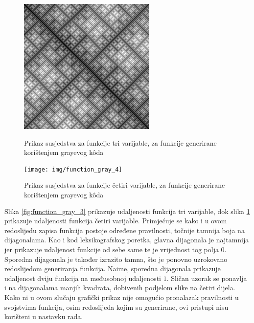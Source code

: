\begin{figure}[!ht]
    \centering
    \begin{minipage}{.5\textwidth}
        \centering
        \includegraphics[width=.95\textwidth]{img/function_gray_3}
        \captionsetup{justification=centering}
        \caption{Prikaz susjedstva za funkcije tri varijable, za funkcije generirane korištenjem grayevog k\^oda}
        \label{fig:function_gray_3}
    \end{minipage}%
    \begin{minipage}{.5\textwidth}
        \centering
        \texttt{[image: img/function\_gray\_4]}
        \captionsetup{justification=centering}
        \caption{Prikaz susjedstva za funkcije četiri varijable, za funkcije generirane korištenjem grayevog k\^oda}
        \label{fig:function_gray_4}
    \end{minipage}
\end{figure}


Slika \ref{fig:function_gray_3} prikazuje udaljenosti funkcija tri varijable, dok slika \ref{fig:function_gray_4} prikazuje udaljenosti funkcija četiri varijable.
Primjećuje se kako i u ovom redoslijedu zapisa funkcija postoje određene pravilnosti, točnije tamnija boja na dijagonalama.
Kao i kod leksikografskog poretka, glavna dijagonala je najtamnija jer prikazuje udaljenost funkcije od sebe same te je vrijednost tog polja $0$.
Sporedna dijagonala je također izrazito tamna, što je ponovno uzrokovano redoslijedom generiranja funkcija.
Naime, sporedna dijagonala prikazuje udaljenost dviju funkcija na međusobnoj udaljenosti $1$.
Sličan uzorak se ponavlja i na dijagonalama manjih kvadrata, dobivenih podjelom slike na četiri dijela.
Kako ni u ovom slučaju grafički prikaz nije omogućio pronalazak pravilnosti u svojstvima funkcija, osim redoslijeda kojim su generirane, ovi pristupi nisu korišteni u nastavku rada.

